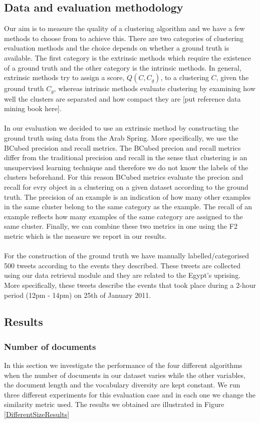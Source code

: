 \subsection{Data and evaluation methodology}
Our aim is to measure the quality of a clustering algorithm and we have a few methods to choose from to achieve this. There are two categories of clustering evaluation methods and the choice depends
on whether a ground truth is available. The first category is the extrinsic methods which require the existence of a ground truth and the other category is the intrinsic methods. In general, extrinsic methods try to assign a score, $Q(C, C_g)$, to a clustering $C$, given the ground truth $C_g$, whereas intrinsic methods evaluate clustering by examining how well the clusters are separated and how compact they are [put reference data mining book here].\\\\ 
In our evaluation we decided to use an extrinsic method by constructing the ground truth using data from the Arab Spring. More specifically, we use the BCubed precision and recall metrics. The BCubed precion and recall metrics differ from the traditional precision and recall in the sense that clustering is an unsupervised learning technique and therefore we do not know the labels of the clusters beforehand. For this reason BCubed metrics evaluate the precion and recall for evry object in a clustering on a given dataset according to the ground truth. The precision of an example is an indication of how many other examples in the same cluster belong to the same category as the example. The recall of an example reflects how many examples of the same category are assigned to the same cluster. Finally, we can combine these two metrics in one using the F2 metric which is the measure we report in our results.\\\\   
For the construction of the ground truth we have manually labelled/categorised 500 tweets according to the events they described. These tweets are collected using our data retrieval module and they are related to the Egypt's uprising. More specifically, these tweets describe the events that took place during a 2-hour period (12pm - 14pm) on 25th of January 2011.    
    
\subsection{Results}
\subsubsection{Number of documents}
In this section we investigate the performance of the four different algorithms when the number of documents in our dataset varies while the other variables, the document length and the vocabulary diversity are kept constant. We run three different experiments for this evaluation case and in each one we change the similarity metric used. The results we obtained are illustrated in Figure \ref{DifferentSizeResults}

